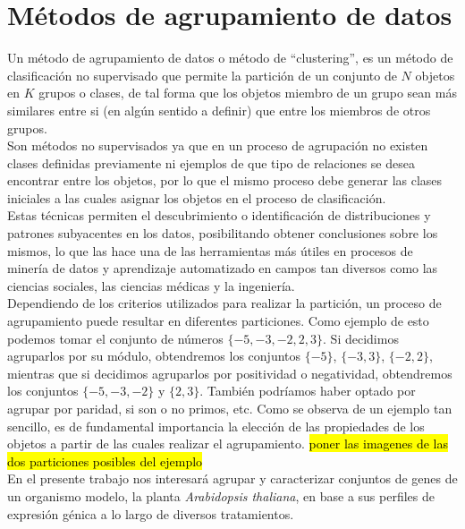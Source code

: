 \chapter{Métodos de agrupamiento de datos}
Un método de agrupamiento de datos o método de ``clustering'', es un método de clasificación no supervisado que permite la partición de un conjunto de $N$ objetos en $K$ grupos o clases, de tal forma que los objetos miembro de un grupo sean más similares entre si (en algún sentido a definir) que entre los miembros de otros grupos.\\
Son métodos no supervisados ya que en un proceso de agrupación no existen clases definidas previamente ni ejemplos de que tipo de relaciones se desea encontrar entre los objetos, por lo que el mismo proceso debe generar las clases iniciales a las cuales asignar los objetos en el proceso de clasificación.\\
Estas técnicas permiten el descubrimiento o identificación de distribuciones y patrones subyacentes en los datos, posibilitando obtener conclusiones sobre los mismos, lo que las hace una de las herramientas más útiles en procesos de minería de datos y aprendizaje automatizado en campos tan diversos como las ciencias sociales, las ciencias médicas y la ingeniería.\\
Dependiendo de los criterios utilizados para realizar la partición, un proceso de agrupamiento puede resultar en diferentes particiones. Como ejemplo de esto podemos tomar el conjunto de números $\{-5, -3, -2, 2, 3\}$. Si decidimos agruparlos por su módulo, obtendremos los conjuntos $\{-5\}$, $\{-3, 3\}$, $\{-2, 2\}$, mientras que si decidimos agruparlos por positividad o negatividad, obtendremos los conjuntos $\{-5, -3, -2\}$ y $\{2, 3\}$. También podríamos haber optado por agrupar por paridad, si son o no primos, etc. Como se observa de un ejemplo tan sencillo, es de fundamental importancia la elección de las propiedades de los objetos a partir de las cuales realizar el agrupamiento.
\hl{poner las imagenes de las dos particiones posibles del ejemplo}\\
En el presente trabajo nos interesará agrupar y caracterizar conjuntos de genes de un organismo modelo, la planta \textit{Arabidopsis thaliana}, en base a sus perfiles de expresión génica a lo largo de diversos tratamientos.\\

\cite{Gan2007}
\cite{Halkidi2001}
\cite{Domany1999}

